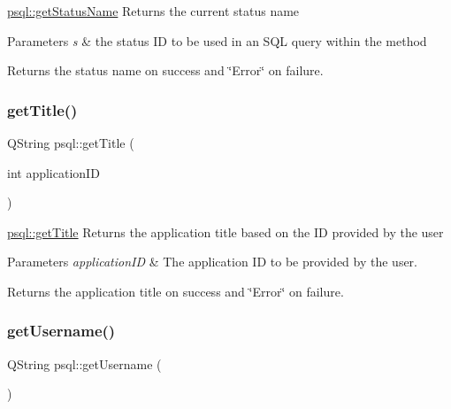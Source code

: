 \mbox{\hyperlink{classpsql_a5c2a64419a68a258071fd1f9a37c7c09}{psql\+::get\+Status\+Name}} Returns the current status name 


\begin{DoxyParams}{Parameters}
{\em s} & the status ID to be used in an S\+QL query within the method \\
\hline
\end{DoxyParams}
\begin{DoxyReturn}{Returns}
the status name on success and \char`\"{}\+Error\char`\"{} on failure. 
\end{DoxyReturn}
\mbox{\label{classpsql_ada9e3be3e0866011edf53e30ec510afc}} 
\subsubsection{\texorpdfstring{getTitle()}{getTitle()}}
{\footnotesize\ttfamily Q\+String psql\+::get\+Title (\begin{DoxyParamCaption}\item[{int}]{application\+ID }\end{DoxyParamCaption})}



\mbox{\hyperlink{classpsql_ada9e3be3e0866011edf53e30ec510afc}{psql\+::get\+Title}} Returns the application title based on the ID provided by the user 


\begin{DoxyParams}{Parameters}
{\em application\+ID} & The application ID to be provided by the user. \\
\hline
\end{DoxyParams}
\begin{DoxyReturn}{Returns}
the application title on success and \char`\"{}\+Error\char`\"{} on failure. 
\end{DoxyReturn}
\mbox{\label{classpsql_aecc9fd93dc5ca0c4f4a63d445a36d166}} 
\subsubsection{\texorpdfstring{getUsername()}{getUsername()}}
{\footnotesize\ttfamily Q\+String psql\+::get\+Username (\begin{DoxyParamCaption}{ }\end{DoxyParamCaption})}



